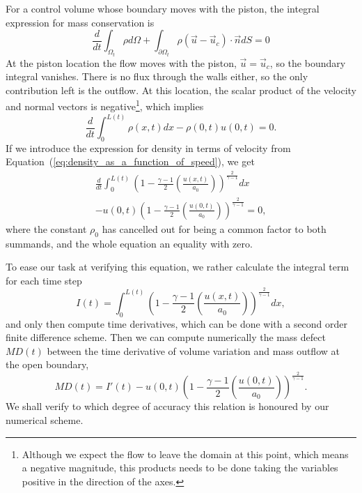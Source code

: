 \documentclass[../../thesis.tex]{subfiles}
\begin{document}
For a control volume whose boundary moves with the piston, 
the integral expression for mass conservation is
\begin{equation}
    \frac{d}{dt}\int_{\Omega_t} \rho d\Omega 
    + \int_{\partial\Omega_t} \rho \left(\vec{u} - \vec{u}_c\right) \cdot \vec{n} dS = 0
\end{equation}
At the piston location the flow moves with the piston, $\vec{u} = \vec{u}_c$, 
so the boundary integral vanishes. 
There is no flux through the walls either, so the only contribution left is the outflow.
At this location, the scalar product of the velocity and normal vectors is 
negative\footnote{Although we expect the flow to leave the domain at this point, 
which means a negative magnitude, this products needs to be done taking 
the variables positive in the direction of the axes.}, which implies
\begin{equation}
    \frac{d}{dt}\int_{0}^{L(t)} \rho(x,t) dx - \rho(0,t) u(0,t) = 0.
    \label{eq:integral_mass_conservation}
\end{equation}
If we introduce the expression for density in terms of velocity from 
Equation~(\ref{eq:density_as_a_function_of_speed}), we get
\begin{equation}
\begin{split}
        \frac{d}{dt}\int_{0}^{L(t)} \left(1 - \frac{\gamma-1}{2}\left(\frac{u(x,t)}{a_0}\right)\right)^{\frac{2}{\gamma-1}} dx 
        \\
        - u(0,t) \left(1 - \frac{\gamma-1}{2}\left(\frac{u(0,t)}{a_0}\right)\right)^{\frac{2}{\gamma-1}}  = 0,
\end{split}
\end{equation}
where the constant $\rho_0$ has cancelled out for being a common factor to both summands,
and the whole equation an equality with zero.

To ease our task at verifying this equation, we rather calculate the integral term for each time step
\begin{equation}
    I(t) = \int_{0}^{L(t)} \left(1 - \frac{\gamma-1}{2}\left(\frac{u(x,t)}{a_0}\right)\right)^{\frac{2}{\gamma-1}} dx,
\end{equation}
and only then compute time derivatives, which can be done with a second order finite difference scheme.
Then we can compute numerically the mass defect $MD(t)$ between the time derivative of volume variation
and mass outflow at the open boundary,
\begin{equation}
    MD(t) = I'(t) - u(0,t) \left(1 - \frac{\gamma-1}{2}\left(\frac{u(0,t)}{a_0}\right)\right)^{\frac{2}{\gamma-1}}.
    \label{eq:mass_conservation_check}
\end{equation}
We shall verify to which degree of accuracy this relation is honoured by our numerical scheme.
\end{document}
